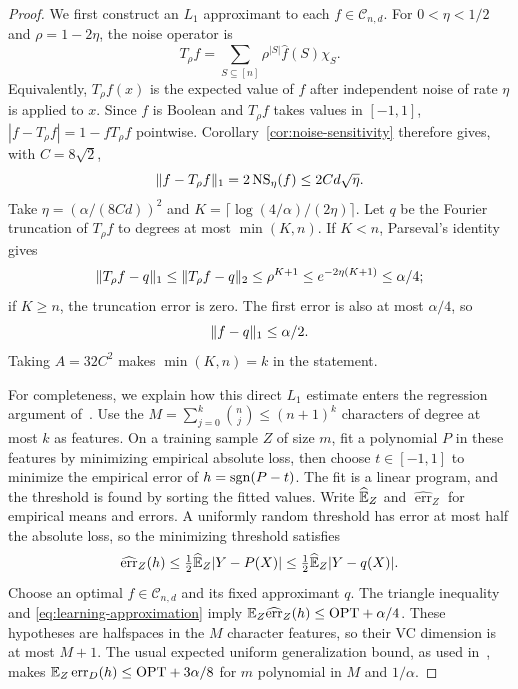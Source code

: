 \begin{proof}
We first construct an $L_1$ approximant to each $f\in\mathcal C_{n,d}$.
For $0<\eta<1/2$ and $\rho=1-2\eta$, the noise operator is
\[
 T_\rho f=\sum_{S\subseteq[n]}\rho^{|S|}\widehat f(S)\chi_S.
\]
Equivalently, $T_\rho f(x)$ is the expected value of $f$ after independent
noise of rate $\eta$ is applied to $x$. Since $f$ is Boolean and
$T_\rho f$ takes values in $[-1,1]$,
$|f-T_\rho f|=1-fT_\rho f$ pointwise. Corollary~\ref{cor:noise-sensitivity}
therefore gives, with $C=8\sqrt2$,
\[
 \lVert f-T_\rho f\rVert_1=2\operatorname{NS}_\eta(f)\le2Cd\sqrt\eta.
\]
Take $\eta=(\alpha/(8Cd))^2$ and
$K=\lceil\log(4/\alpha)/(2\eta)\rceil$.
Let $q$ be the Fourier truncation of $T_\rho f$ to degrees at most
$\min(K,n)$. If $K<n$, Parseval's identity gives
\[
 \lVert T_\rho f-q\rVert_1\le\lVert T_\rho f-q\rVert_2
 \le\rho^{K+1}\le e^{-2\eta(K+1)}\le\alpha/4;
\]
if $K\ge n$, the truncation error is zero.
The first error is also at most $\alpha/4$, so
\begin{equation}\label{eq:learning-approximation}
 \lVert f-q\rVert_1\le\alpha/2.
\end{equation}
Taking $A=32C^2$ makes $\min(K,n)=k$ in the statement.

For completeness, we explain how this direct $L_1$ estimate enters the
regression argument of~\cite[proof of Theorem~5]{KKMS2008}.
Use the $M=\sum_{j=0}^k\binom nj\le(n+1)^k$ characters of degree at
most $k$ as features. On a training sample $Z$ of size $m$, fit a
polynomial $P$ in these features by minimizing empirical absolute loss,
then choose $t\in[-1,1]$ to minimize the empirical error of
$h=\operatorname{sgn}(P-t)$. The fit is a linear program, and the threshold is found by
sorting the fitted values. Write $\widehat{\mathbb E}_Z$ and
$\widehat{\operatorname{err}}_Z$ for empirical means and errors.
A uniformly random threshold has error at most half the absolute loss,
so the minimizing threshold satisfies
\[
 \widehat{\operatorname{err}}_Z(h)
 \le\tfrac12\widehat{\mathbb E}_Z|Y-P(X)|
 \le\tfrac12\widehat{\mathbb E}_Z|Y-q(X)|.
\]
Choose an optimal $f\in\mathcal C_{n,d}$ and its fixed approximant $q$.
The triangle inequality and \eqref{eq:learning-approximation} imply
$\mathbb E_Z\widehat{\operatorname{err}}_Z(h)\le\mathrm{OPT}+\alpha/4$.
These hypotheses are halfspaces in the $M$ character features, so their
VC dimension is at most $M+1$.
The usual expected uniform generalization bound, as used
in~\cite[proof of Theorem~5]{KKMS2008}, makes
$\mathbb E_Z\operatorname{err}_D(h)\le\mathrm{OPT}+3\alpha/8$
for $m$ polynomial in $M$ and $1/\alpha$.


\end{proof}
